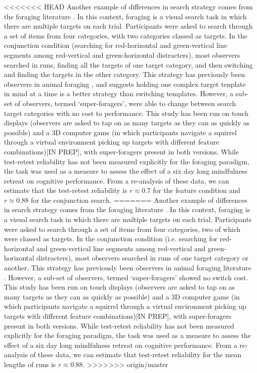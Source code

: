 \documentclass[]{rsos}%
\begin{document}
<<<<<<< HEAD
Another example of differences in search strategy comes from the foraging literature \cite{kristjansson2014,johannesson2016}. In this context, foraging is a visual search task in which there are multiple targets on each trial. Participants were asked to search through a set of items from four categories, with two categories classed as targets. In the conjunction condition (searching for red-horizontal and green-vertical line segments among red-vertical and green-horizontal distracters), most observers searched in runs, finding all the targets of one target category, and then switching and finding the targets in the other category. This strategy has previously been observers in animal foraging \cite{dawkins1971}, and suggests holding one complex target tenplate in mind at a time is a better strategy than switching templates. However, a sub-set of observers, termed `super-foragers', were able to change between search target categories with no cost to performance. This study has been run on touch displays\cite{kristjansson2014} (observers are asked to tap on as many targets as they can as quickly as possible) and a 3D computer game (in which participants navigate a squirrel through a virtual environment picking up targets with different feature combinations)[IN PREP], with super-foragers present in both versions. While test-retest reliability has not been measured explicitly for the foraging paradigm, the task was used as a measure to assess the effect of a six day long mindfulness retreat on cognitive performance\cite{hartkamp2017}. From a re-analysis of these data, we can estimate that the test-retest reliability is $r \approx 0.7$ for the feature condition and $r \approx 0.88$ for the conjunction search.  
=======
Another example of differences in search strategy comes from the foraging literature \cite{kristjansson2014,johannesson2016}. In this context, foraging is a visual search task in which there are multiple targets on each trial. Participants were asked to search through a set of items from four categories, two of which were classed as targets. In the conjunction condition (i.e. searching for red-horizontal and green-vertical line segments among red-vertical and green-horizontal distracters), most observers searched in runs of one target category or another. This strategy has previously been observers in animal foraging literature \cite{dawkins1971}. However, a sub-set of observers, termed `super-foragers' showed no switch cost. This study has been run on touch displays\cite{kristjansson2014} (observers are asked to tap on as many targets as they can as quickly as possible) and a 3D computer game (in which participants navigate a squirrel through a virtual environment picking up targets with different feature combinations)[IN PREP], with super-foragers present in both versions. While test-retest reliability has not been measured explicitly for the foraging paradigm, the task was used as a measure to assess the effect of a six day long mindfulness retreat on cognitive performance\cite{hartkamp2017}. From a re-analysis of these data, we can estimate that test-retest reliability for the mean lengths of runs is $r\approx 0.88$.
>>>>>>> origin/master
\end{document}
